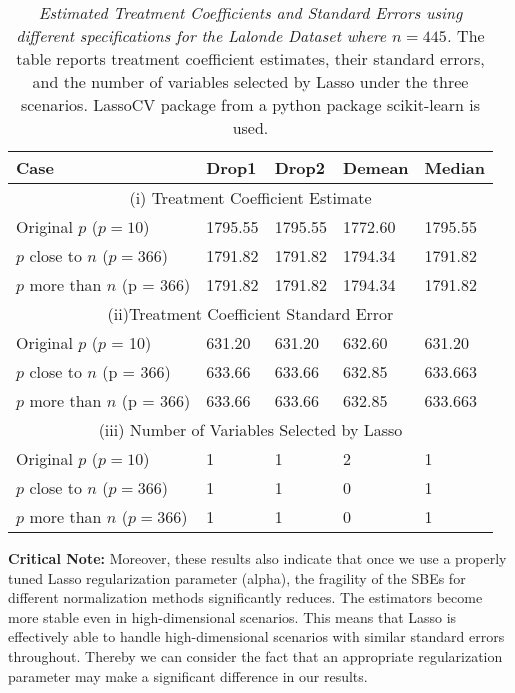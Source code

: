 \begin{table}[h!]
\renewcommand{\arraystretch}{1.5}
\centering
\begin{tabular}{||l l l l l||} 
 \hline
 \hline
 Case & Drop1 & Drop2 & Demean & Median \\ [0.5ex] 
 \hline \hline
 \multicolumn{5}{||c||}{(i) Treatment Coefficient Estimate} \\ [0.5ex]
 Original $p$ ($p = 10$) & 1795.55 & 1795.55 & 1772.60 & 1795.55  \\ 
 $p$ close to $n$ ($p = 366$) & 1791.82 & 1791.82 & 1794.34 & 1791.82 \\
 $p$ more than $n$ (p = 366) & 1791.82 & 1791.82 & 1794.34 & 1791.82  \\
 \hline
 \multicolumn{5}{||c||}{(ii)Treatment Coefficient Standard Error} \\ [0.5ex]
 Original $p$ ($p$ = 10) & 631.20 & 631.20 & 632.60 & 631.20 \\ 
 $p$ close to $n$ (p = 366) & 633.66 & 633.66& 632.85 & 633.663  \\
 $p$ more than $n$ (p = 366) & 633.66 & 633.66& 632.85 & 633.663 \\
 \hline
 \multicolumn{5}{||c||}{(iii) Number of Variables Selected by Lasso} \\ [0.5ex]
 Original $p$ ($p = 10$) & 1 & 1 & 2 & 1 \\ 
 $p$ close to $n$ ($p = 366$) & 1 & 1 & 0 & 1 \\
 $p$ more than $n$ ($p = 366$) & 1 & 1 & 0 & 1 \\
 \hline \hline
\end{tabular}
\caption{\textit{Estimated Treatment Coefficients and Standard Errors using different specifications for the Lalonde Dataset where $n = 445$.} The table reports treatment coefficient estimates, their standard errors, and the number of variables selected by Lasso under the three scenarios. LassoCV package from a python package scikit-learn is used.}
\label{table:1}
\end{table}

\textbf{Critical Note:} Moreover, these results also indicate that once we use a properly tuned Lasso regularization parameter (alpha), the fragility of the SBEs for different normalization methods significantly reduces. The estimators become more stable even in high-dimensional scenarios. This means that Lasso is effectively able to handle high-dimensional scenarios with similar standard errors throughout. Thereby we can consider the fact that an appropriate regularization parameter may make a significant difference in our results. 


